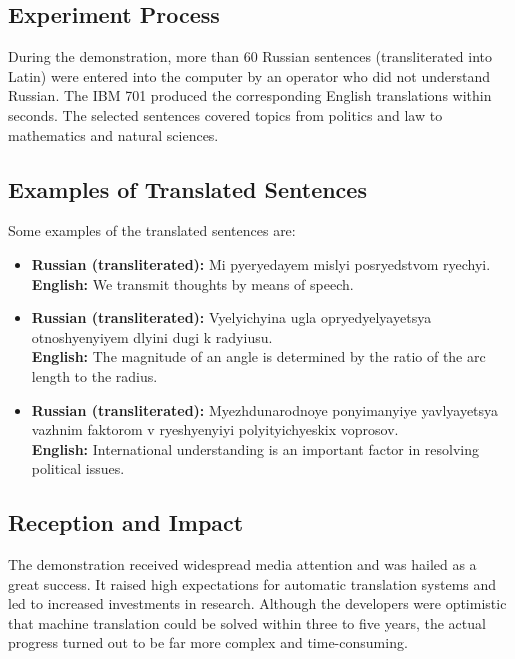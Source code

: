 \subsection{Experiment Process}

During the demonstration, more than 60 Russian sentences (transliterated into Latin)
were entered into the computer by an operator who did not understand Russian. The IBM
701 produced the corresponding English translations within seconds. The selected
sentences covered topics from politics and law to mathematics and natural sciences.

\subsection{Examples of Translated Sentences}

Some examples of the translated sentences are:
\begin{itemize}
  \item \textbf{Russian (transliterated):} Mi pyeryedayem mislyi posryedstvom ryechyi.\\
        \textbf{English:} We transmit thoughts by means of speech.
  \item \textbf{Russian (transliterated):} Vyelyichyina ugla opryedyelyayetsya otnoshyenyiyem 
        dlyini dugi k radyiusu.\\
        \textbf{English:} The magnitude of an angle is determined by the ratio of the arc
        length to the radius.
  \item \textbf{Russian (transliterated):} Myezhdunarodnoye ponyimanyiye yavlyayetsya vazhnim 
        faktorom v ryeshyenyiyi polyityichyeskix voprosov.\\
        \textbf{English:} International understanding is an important factor in resolving
        political issues.
\end{itemize}

\subsection{Reception and Impact}

The demonstration received widespread media attention and was hailed as a great success.
It raised high expectations for automatic translation systems and led to increased
investments in research. Although the developers were optimistic that machine translation
could be solved within three to five years, the actual progress turned out to be far more
complex and time-consuming.

